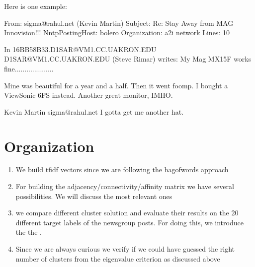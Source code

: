 \documentclass[letterpaper,10pt,english]{jupyterBook}
\begin{document}
\sphinxAtStartPar
Here is one example:

\begin{sphinxVerbatim}[commandchars=\\\{\}]
From: sigma@rahul.net (Kevin Martin)
Subject: Re: Stay Away from MAG Innovision!!!
Nntp\PYGZhy{}Posting\PYGZhy{}Host: bolero
Organization: a2i network
Lines: 10

In \PYGZlt{}16BB58B33.D1SAR@VM1.CC.UAKRON.EDU\PYGZgt{} D1SAR@VM1.CC.UAKRON.EDU (Steve Rimar) writes:
\PYGZgt{}My Mag MX15F works fine....................

Mine was beautiful for a year and a half.  Then it went \PYGZlt{}foomp\PYGZgt{}.  I bought
a ViewSonic 6FS instead.  Another great monitor, IMHO.

\PYGZhy{}\PYGZhy{} 
Kevin Martin
sigma@rahul.net
\PYGZdq{}I gotta get me another hat.\PYGZdq{}
\end{sphinxVerbatim}

\noindent{}


\section{Organization}
\label{\detokenize{Text_Clustering:organization}}\begin{enumerate}
%
\item {} 
\sphinxAtStartPar
We build tf\sphinxhyphen{}idf vectors since we are following the bag\sphinxhyphen{}of\sphinxhyphen{}words approach

\item {} 
\sphinxAtStartPar
For building the adjacency/connectivity/affinity matrix we have several possibilities. We will discuss the most relevant ones

\item {} 
\sphinxAtStartPar
we compare different cluster solution and evaluate their results on the 20 different target labels of the newsgroup posts. For doing this, we introduce the the .

\item {} 
\sphinxAtStartPar
Since we are always curious we verify if we could have guessed the right number of clusters from the eigenvalue criterion as discussed above

\end{enumerate}
\end{document}
